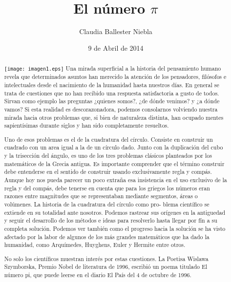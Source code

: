 \documentclass[spanish,a4paper,10pt]{article}
\begin{document}
\title{El número $\pi$}
\author{Claudia Ballester Niebla}
\date{9 de Abril de 2014}

\maketitle

\begin{abstract}
\texttt{[image: imagen1.eps]} 
Una mirada superficial a la historia del pensamiento humano revela que determinados asuntos han merecido la atención de los pensadores, filósofos e intelectuales desde el nacimiento de la humanidad hasta nuestros días. En general se trata de cuestiones que no han recibido una respuesta satisfactoria a gusto de todos. Sirvan como ejemplo las preguntas ¿quienes somos?, ¿de dónde venimos? y ¿a dónde vamos? Si esta realidad es descorazonadora, podemos consolarnos volviendo nuestra mirada hacia otros problemas que, si bien de naturaleza distinta, han ocupado mentes sapientísimas durante siglos y han sido completamente resueltos.

Uno de esos problemas es el de la cuadratura del círculo. Consiste en construir un cuadrado con un area igual a la de un  círculo dado. Junto con la duplicación del cubo y la trisección del ángulo, es uno de los tres problemas clásicos planteados por los matemáticos de la Grecia antigua. Es importante comprender que el término construir debe entenderse en el sentido de
construir usando exclusivamente regla y compás. Aunque hoy nos pueda parecer un poco
extraña esa insistencia en el uso exclusivo de la regla y del compás, debe tenerse en cuenta
que para los griegos los números eran razones entre magnitudes que se representaban
mediante segmentos, áreas o volúmenes. La historia de la cuadratura del círculo como pro-
blema científico se extiende en su totalidad ante nosotros. Podemos rastrear sus orígenes en
la antiguedad y seguir el desarrollo de los métodos e ideas para resolverlo hasta llegar por fín
a su completa solución. Podemos ver también como el progreso hacia la solución se ha visto
afectado por la labor de algunos de los más grandes matemáticos que ha dado la humanidad,
como Arquímedes, Huyghens, Euler y Hermite entre otros.

No solo los científicos muestran interés por estas cuestiones. La Poetisa Wislawa Szymborska,
Premio Nobel de literatura de 1996, escribió un poema titulado
El número pi, que puede leerse en el diario El País del 4 de octubre de 1996.
\end{abstract}
\end{document}
